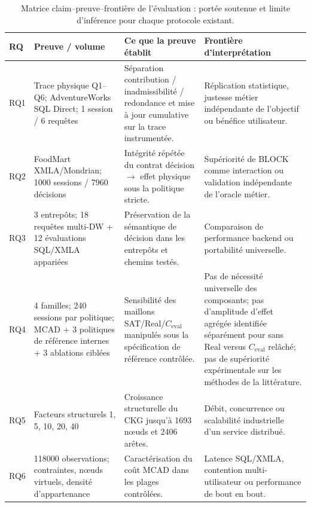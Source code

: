\begin{table}[!t]
\centering
\caption{Matrice claim--preuve--frontière de l'évaluation : portée soutenue et limite d'inférence pour chaque protocole existant.}
\label{tab:evaluation-scope}
\scriptsize
\setlength{\tabcolsep}{2.0pt}
\renewcommand{\arraystretch}{1.08}
\begin{tabularx}{\textwidth}{@{}p{0.55cm}p{4.25cm}p{5.25cm}X@{}}
\toprule
RQ & Preuve / volume & Ce que la preuve établit & Frontière d'interprétation \\
\midrule
RQ1 & Trace physique Q1--Q6; AdventureWorks SQL Direct; 1 session / 6 requêtes & Séparation contribution / inadmissibilité / redondance et mise à jour cumulative sur la trace instrumentée. & Réplication statistique, justesse métier indépendante de l'objectif ou bénéfice utilisateur. \\
RQ2 & FoodMart XMLA/Mondrian; 1000 sessions / 7960 décisions & Intégrité répétée du contrat décision $\rightarrow$ effet physique sous la politique stricte. & Supériorité de BLOCK comme interaction ou validation indépendante de l'oracle métier. \\
RQ3 & 3 entrepôts; 18 requêtes multi-DW + 12 évaluations SQL/XMLA appariées & Préservation de la sémantique de décision dans les entrepôts et chemins testés. & Comparaison de performance backend ou portabilité universelle. \\
RQ4 & 4 familles; 240 sessions par politique; MCAD + 3 politiques de référence internes + 3 ablations ciblées & Sensibilité des maillons SAT/Real/$C_{\mathrm{eval}}$ manipulés sous la spécification de référence contrôlée. & Pas de nécessité universelle des composants; pas d'amplitude d'effet agrégée identifiée séparément pour sans Real versus $C_{\mathrm{eval}}$ relâché; pas de supériorité expérimentale sur les méthodes de la littérature. \\
RQ5 & Facteurs structurels 1, 5, 10, 20, 40 & Croissance structurelle du CKG jusqu'à 1693 nœuds et 2406 arêtes. & Débit, concurrence ou scalabilité industrielle d'un service distribué. \\
RQ6 & 118000 observations; contraintes, nœuds virtuels, densité d'appartenance & Caractérisation du coût MCAD dans les plages contrôlées. & Latence SQL/XMLA, contention multi-utilisateur ou performance de bout en bout. \\
\bottomrule
\end{tabularx}
\normalsize
\end{table}
